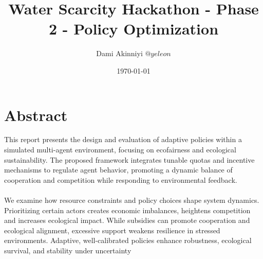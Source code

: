 \documentclass[a4paper, 12pt]{article}
\title{Water Scarcity Hackathon - Phase 2 - Policy Optimization}
\author{Dami Akinniyi \textit{\(@yeleon\)}}
\date{\today}
\begin{document}
\maketitle
\section*{Abstract}
This report presents the design and evaluation of adaptive policies within a simulated 
multi-agent environment, focusing on ecofairness and ecological sustainability. 
The proposed framework integrates tunable quotas and incentive mechanisms to regulate 
agent behavior, promoting a dynamic balance of cooperation and competition while responding 
to environmental feedback. %
\\ \\
We examine how resource constraints and policy choices shape system dynamics. 
Prioritizing certain actors creates economic imbalances, heightens competition and increases ecological impact. 
While subsidies can promote cooperation and ecological alignment, excessive support weakens resilience in stressed environments. 
Adaptive, well-calibrated policies enhance robustness, ecological survival, and stability under uncertainty
\end{document}
